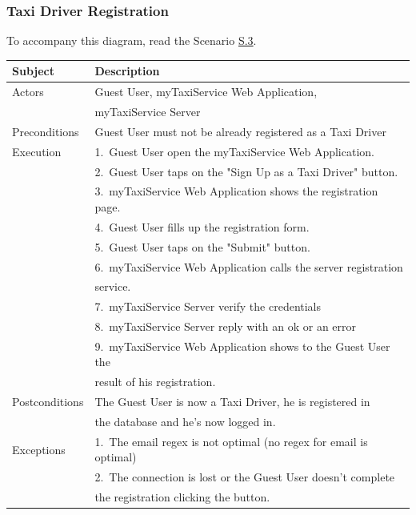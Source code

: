 \subsubsection{Taxi Driver Registration}
			To accompany this diagram, read the Scenario \hyperref[sec:TaxiDriverRegistrationScenario]{S.3}.

				\begin{table}[htpb]
					\centering
					\label{tab:TaxiDriverRegistrationDiagramTable}
					\begin{tabularx}{\textwidth}{ll}
						\hline
						\hline
							\textbf{Subject}
						& 
							\textbf{Description}\\
						\hline
							Actors	       &  Guest User, myTaxiService Web Application, \\
										   &  myTaxiService Server\\
						\hline
							Preconditions  &  Guest User must not be already registered as a Taxi Driver\\
						\hline
							Execution      &  1.~Guest User open the myTaxiService Web Application.\\
										   &  2.~Guest User taps on the "Sign Up as a Taxi Driver" button.\\
										   &  3.~myTaxiService Web Application shows the registration page.\\
										   &  4.~Guest User fills up the registration form.\\
										   &  5.~Guest User taps on the "Submit" button.\\
										   &  6.~myTaxiService Web Application calls the server registration\\
										   &     service.\\
										   &  7.~myTaxiService Server verify the credentials\\
										   &  8.~myTaxiService Server reply with an ok or an error\\
										   &  9.~myTaxiService Web Application shows to the Guest User the\\
										   &     result of his registration.\\
						\hline
							Postconditions &  The Guest User is now a Taxi Driver, he is registered in \\ 
										   &  the database and he's now logged in.\\
						\hline
							Exceptions     &  1.~The email regex is not optimal (no regex for email is optimal)\\
										   &  2.~The connection is lost or the Guest User doesn't complete\\ 
										   &     the registration clicking the button.\\
									
						\hline
						\hline
					\end{tabularx}
				\end{table}
				

